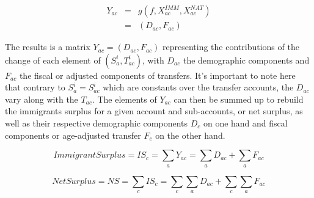 \begin{eqnarray}
  Y_{ac}&=&g(f,X^{IMM}_{ac},X^{NAT}_{ac}) \nonumber \\
&=& (D_{ac}, F_{ac}) \label{eq:dc2}
\end{eqnarray}

The results is a matrix \( Y_{ac} = (D_{ac}, F_{ac}) \) representing the contributions of the change of each element of \( (S^{i}_a, T^{i}_{ac})\), with \( D_{ac}\) the demographic components and \( F_{ac}\) the fiscal or adjusted components of transfers.
It's important to note here that contrary to  \( S^{i}_{a}=S^{i}_{ac} \) which are constants over the transfer accounts, the \( D_{ac} \) vary along with the \(T_{ac}\).
The elements of \( Y_{ac} \) can then be summed up to rebuild the immigrants surplus for a given account and sub-accounts, or net surplus, as well as their respective demographic components \( D_{c} \) on one hand and fiscal components or age-adjusted transfer \( F_{c} \) on the other hand.

\begin{equation}\label{eq:dc3}
  Immigrant Surplus =IS_{c} = \displaystyle\sum_{a}Y_{ac} = \displaystyle\sum_{a}D_{ac} + \displaystyle\sum_{a}F_{ac}
\end{equation}

\begin{equation}\label{eq:dc4}
  Net Surplus = NS = \displaystyle\sum_{c}IS_{c} = \displaystyle\sum_{c}\displaystyle\sum_{a}D_{ac} + \displaystyle\sum_{c}\displaystyle\sum_{a}F_{ac}
\end{equation}

